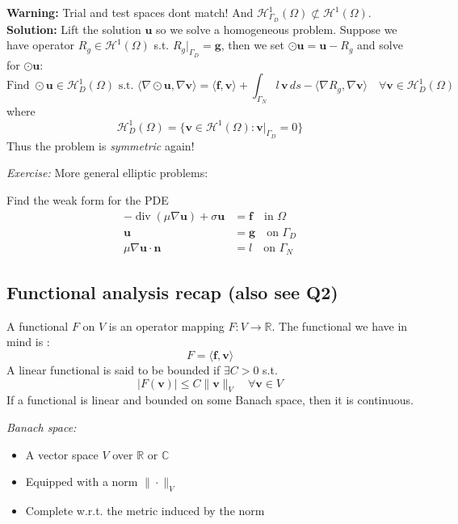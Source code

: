 \textbf{Warning:} Trial and test spaces dont match! And $\mathcal{H}^1_{\Gamma_D}(\Omega) \nsubset \mathcal{H}^1(\Omega)$.
\textbf{Solution:} Lift the solution $\mathbf{u}$ so we solve a homogeneous problem.
Suppose we have operator $R_g \in \mathcal{H}^1(\Omega)$ s.t. $R_g\vert_{\Gamma_D} = \mathbf{g}$, then we set $\odot{\mathbf{u}} = \mathbf{u} - R_g$ and solve for $\odot{\mathbf{u}}$:
\[
    \text{Find } \odot{\mathbf{u}} \in \mathcal{H}^1_D(\Omega) \text{ s.t. } \langle \nabla \odot{\mathbf{u}}, \nabla \mathbf{v} \rangle = \langle \mathbf{f}, \mathbf{v} \rangle + \int_{\Gamma_N} l \, \mathbf{v} \, ds - \langle \nabla R_g, \nabla \mathbf{v} \rangle \quad \forall \mathbf{v} \in \mathcal{H}^1_D(\Omega)
\]
where
\[
    \mathcal{H}^1_D(\Omega) = \{ \mathbf{v} \in \mathcal{H}^1(\Omega) : \mathbf{v}\vert_{\Gamma_D} = 0 \}
\]
Thus the problem is \emph{symmetric} again!

\textit{Exercise:} More general elliptic problems:

Find the weak form for the PDE
\begin{align*}
    -\operatorname{div}{(\mu \nabla \mathbf{u})} + \sigma \mathbf{u} & = \mathbf{f} \quad \text{in } \Omega   \\
    \mathbf{u}                                                       & = \mathbf{g} \quad \text{on } \Gamma_D \\
    \mu \nabla \mathbf{u} \cdot \textbf{n}                           & = l \quad \text{on } \Gamma_N
\end{align*}

\subsection*{Functional analysis recap (also see Q2)}
A functional $F$ on $V$ is an operator mapping $F: V \to \mathbb{R}$.
The functional we have in mind is :
\[F = \langle \mathbf{f}, \mathbf{v} \rangle\]
A linear functional is said to be bounded if $\exists C > 0$ s.t.
\[|F(\mathbf{v})| \leq C \|\mathbf{v}\|_V \quad \forall \mathbf{v} \in V\]
If a functional is linear and bounded on some Banach space, then it is continuous.

\textit{Banach space: }
\begin{itemize}
    \item A vector space $V$ over $\mathbb{R}$ or $\mathbb{C}$
    \item Equipped with a norm $\|\cdot\|_V$
    \item Complete w.r.t. the metric induced by the norm
\end{itemize}

